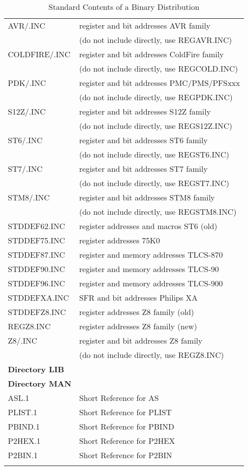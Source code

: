 \documentclass[12pt,twoside]{report}
\newcommand{\asname}{{AS}}
\begin{document}
\begin{center}
\begin{longtable}{|l|l|}
AVR/\*.INC        & register and bit addresses AVR family \\
                  & (do not include directly, use REGAVR.INC) \\
COLDFIRE/\*.INC   & register and bit addresses ColdFire family \\
                  & (do not include directly, use REGCOLD.INC) \\
PDK/\*.INC        & register and bit addresses PMC/PMS/PFSxxx \\
                  & (do not include directly, use REGPDK.INC) \\
S12Z/\*.INC       & register and bit addresses S12Z family \\
                  & (do not include directly, use REGS12Z.INC) \\
ST6/\*.INC        & register and bit addresses ST6 family \\
                  & (do not include directly, use REGST6.INC) \\
ST7/\*.INC        & register and bit addresses ST7 family \\
                  & (do not include directly, use REGST7.INC) \\
STM8/\*.INC       & register and bit addresses STM8 family \\
                  & (do not include directly, use REGSTM8.INC) \\
STDDEF62.INC      & register addresses and macros ST6 (old)\\
STDDEF75.INC      & register addresses 75K0 \\
STDDEF87.INC      & register and memory addresses TLCS-870 \\
STDDEF90.INC      & register and memory addresses TLCS-90 \\
STDDEF96.INC      & register and memory addresses TLCS-900 \\
STDDEFXA.INC      & SFR and bit addresses Philips XA \\
STDDEFZ8.INC      & register addresses Z8 family (old) \\
REGZ8.INC         & register addresses Z8 family (new) \\
Z8/\*.INC         & register and bit addresses Z8 family \\
                  & (do not include directly, use REGZ8.INC) \\
\hline
{\bf Directory LIB} & \\
\hline
{\bf Directory MAN} & \\
\hline
ASL.1             & Short Reference for \asname{} \\
PLIST.1           & Short Reference for PLIST \\
PBIND.1           & Short Reference for PBIND \\
P2HEX.1           & Short Reference for P2HEX \\
P2BIN.1           & Short Reference for P2BIN \\
\hline
\caption{Standard Contents of a Binary Distribution
         \label{TabCommonPackageList}}
\end{longtable}\end{center}
\end{document}
